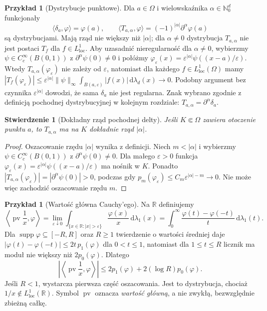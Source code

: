 \documentclass[11pt,a4paper]{article}
\numberwithin{equation}{section}
\theoremstyle{plain}
\newtheorem{stwierdzenie}[twierdzenie]{Stwierdzenie}
\theoremstyle{definition}
\newtheorem{przyklad}[twierdzenie]{Przykład}
\theoremstyle{remark}
\newcommand{\R}{\mathbb R}
\newcommand{\N}{\mathbb N}
\DeclareMathOperator{\supp}{supp}
\begin{document}
\begin{przyklad}[Dystrybucje punktowe]
\label{ex:delta19}
Dla $a\in\Omega$ i wielowskaźnika $\alpha\in\N_0^d$
funkcjonały
\[\langle\delta_a,\varphi\rangle=\varphi(a),\qquad
\langle T_{a,\alpha},\varphi\rangle
=(-1)^{|\alpha|}\partial^\alpha\varphi(a)\]
są dystrybucjami. Mają rząd nie większy niż $|\alpha|$;
dla $\alpha\ne0$ dystrybucja $T_{a,\alpha}$ nie jest
postaci $T_f$ dla $f\in L^1_{\mathrm{loc}}$. Aby uzasadnić nieregularność dla $\alpha\ne0$,
wybierzmy $\psi\in C_c^\infty(B(0,1))$ z
$\partial^\alpha\psi(0)\ne0$ i połóżmy
$\varphi_\varepsilon(x)=\varepsilon^{|\alpha|}
\psi((x-a)/\varepsilon)$. Wtedy
$T_{a,\alpha}(\varphi_\varepsilon)$ nie zależy od
$\varepsilon$, natomiast dla każdego
$f\in L^1_{\mathrm{loc}}(\Omega)$ mamy
$|T_f(\varphi_\varepsilon)|\le
\varepsilon^{|\alpha|}\|\psi\|_\infty
\int_{B(a,\varepsilon)}|f(x)|\,\mathrm d\lambda_d(x)
\to0$. Podobny argument bez czynnika
$\varepsilon^{|\alpha|}$ dowodzi, że sama $\delta_a$
nie jest regularna. Znak wybrano zgodnie z definicją
pochodnej dystrybucyjnej w kolejnym rozdziale:
$T_{a,\alpha}=\partial^\alpha\delta_a$.
\end{przyklad}

\begin{stwierdzenie}[Dokładny rząd pochodnej delty]
\label{prop:delta-order19}
Jeśli $K\Subset\Omega$ zawiera otoczenie punktu $a$,
to $T_{a,\alpha}$ ma na $K$ dokładnie rząd $|\alpha|$.
\end{stwierdzenie}
\begin{proof}
Oszacowanie rzędu $|\alpha|$ wynika z definicji.
Niech $m<|\alpha|$ i wybierzmy
$\psi\in C_c^\infty(B(0,1))$ z
$\partial^\alpha\psi(0)\ne0$.
Dla małego $\varepsilon>0$ funkcja
$\varphi_\varepsilon(x)=\varepsilon^{|\alpha|}
\psi((x-a)/\varepsilon)$ ma nośnik w $K$. Ponadto
$|T_{a,\alpha}(\varphi_\varepsilon)|
=|\partial^\alpha\psi(0)|>0$, podczas gdy
$p_m(\varphi_\varepsilon)\le C_m\varepsilon^{|\alpha|-m}
\to0$. Nie może więc zachodzić oszacowanie rzędu $m$.
\end{proof}

\begin{przyklad}[Wartość główna Cauchy'ego]
\label{ex:principal-value19}
Na $\R$ definiujemy
\[\left\langle\operatorname{pv}\frac1x,\varphi\right\rangle
=\lim_{\varepsilon\downarrow0}
\int_{\{x\in\R:|x|>\varepsilon\}}
\frac{\varphi(x)}{x}\,\mathrm d\lambda_1(x)
=\int_0^\infty\frac{\varphi(t)-\varphi(-t)}{t}\,
\mathrm d\lambda_1(t).\]
Dla $\supp\varphi\subseteq[-R,R]$ oraz $R\ge1$
twierdzenie o wartości średniej daje
$|\varphi(t)-\varphi(-t)|\le2t\,p_1(\varphi)$ dla
$0<t\le1$, natomiast dla $1\le t\le R$ licznik
ma moduł nie większy niż $2p_0(\varphi)$. Dlatego
\[\left|\left\langle\operatorname{pv}\frac1x,
\varphi\right\rangle\right|\le
2p_1(\varphi)+2(\log R)p_0(\varphi).\]
Jeśli $R<1$, wystarcza pierwsza część oszacowania.
Jest to dystrybucja, chociaż $1/x\notin L^1_{\mathrm{loc}}(\R)$.
Symbol $\operatorname{pv}$ oznacza \emph{wartość główną},
a nie zwykłą, bezwzględnie zbieżną całkę.
\end{przyklad}
\end{document}
